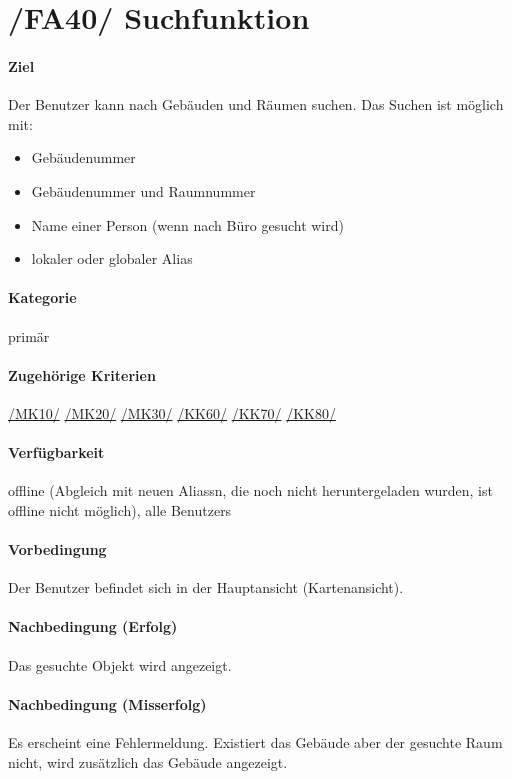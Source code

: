 \section[Suchfunktion]{/FA40/ Suchfunktion}
\label{/FA40/}
\paragraph{Ziel}
Der \Gls{Benutzer} kann nach Gebäuden und Räumen suchen. 
Das Suchen ist möglich mit:
\begin{itemize}
    \item Gebäudenummer
    \item Gebäudenummer und Raumnummer
    \item Name einer Person (wenn nach Büro gesucht wird)
    \item \gls{lokal}er oder \gls{global}er \Gls{Alias}
\end{itemize}

\paragraph{Kategorie}
primär
\paragraph{Zugehörige Kriterien}
\hyperref[/MK10/]{/MK10/} \hyperref[/MK20/]{/MK20/} \hyperref[/MK30/]{/MK30/} \hyperref[/KK60/]{/KK60/} \hyperref[/KK70/]{/KK70/} \hyperref[/KK80/]{/KK80/} 
\paragraph{Verfügbarkeit}
\gls{offline} (Abgleich mit neuen \Glspl{Alias}n, die noch nicht heruntergeladen wurden, ist \gls{offline} nicht möglich), alle \Glspl{Benutzer}
\paragraph{Vorbedingung}
Der \Gls{Benutzer} befindet sich in der Hauptansicht (\Gls{Kartenansicht}).
\paragraph{Nachbedingung (Erfolg)}
Das gesuchte Objekt wird angezeigt.
\paragraph{Nachbedingung (Misserfolg)}
Es erscheint eine Fehlermeldung. Existiert das Gebäude aber der gesuchte Raum nicht, wird zusätzlich das Gebäude angezeigt.
